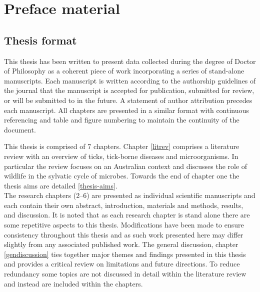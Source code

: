 \documentclass[a4paper, nobind]{templates/ociamthesis}
\renewcommand{\chaptermark}[1]{\markboth{\thechapter. #1}{\thechapter. #1}}
\begin{document}
\hypertarget{preface-material}{%
\chapter*{Preface material}\label{preface-material}}

\adjustmtc 
\chaptermark{Preface}

\hypertarget{thesis-format}{%
\section*{Thesis format}\label{thesis-format}}

This thesis has been written to present data collected during the degree of Doctor of Philosophy as a coherent piece of work incorporating a series of stand-alone manuscripts.
Each manuscript is written according to the authorship guidelines of the journal that the manuscript is accepted for publication, submitted for review, or will be submitted to in the future.
A statement of author attribution precedes each manuscript.
All chapters are presented in a similar format with continuous referencing and table and figure numbering to maintain the continuity of the document.

This thesis is comprised of 7 chapters.
Chapter \ref{litrev} comprises a literature review with an overview of ticks, tick-borne diseases and microorganisms.
In particular the review focuses on an Australian context and discusses the role of wildlife in the sylvatic cycle of microbes.
Towards the end of chapter one the thesis aims are detailed \ref{thesis-aims}.\\
The research chapters (2--6) are presented as individual scientific manuscripts and each contain their own abstract, introduction, materials and methods, results, and discussion.
It is noted that as each research chapter is stand alone there are some repetitive aspects to this thesis.
Modifications have been made to ensure consistency throughout this thesis and as such work presented here may differ slightly from any associated published work.
The general discussion, chapter \ref{gendiscussion} ties together major themes and findings presented in this thesis and provides a critical review on limitations and future directions.
To reduce redundancy some topics are not discussed in detail within the literature review and instead are included within the chapters.
\end{document}
